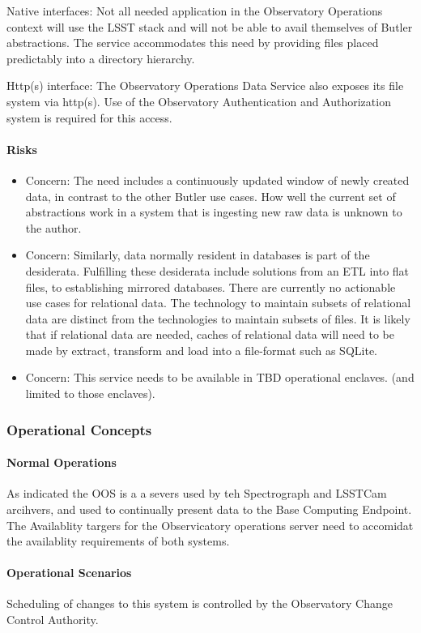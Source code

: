 Native interfaces: Not all needed application in the Observatory Operations context 
will use the LSST stack and will not be able to avail themselves of Butler abstractions.  
The service accommodates this need by providing files placed predictably into a 
directory hierarchy.

Http(s) interface: The Observatory Operations Data Service also exposes its 
file system via http(s). Use of the Observatory Authentication and Authorization 
system is required for this access.

\paragraph{Risks}

\begin{itemize}

\item Concern: The need includes a continuously updated window of newly created 
data, in contrast to the other Butler use cases.  How well the current set of 
abstractions work in a system that is ingesting new raw data  is unknown to the 
author.  

\item Concern: Similarly, data normally resident in databases is part of the desiderata. 
Fulfilling these desiderata include solutions from an ETL into flat files, to 
establishing mirrored databases. There are currently no actionable use cases 
for relational data. The technology to maintain subsets of relational data are distinct 
from the technologies to maintain subsets of files. It is likely that if relational data are 
needed, caches of relational data will need to be made by extract, transform and load 
into a file-format such as SQLite. 

\item Concern: This service needs to be available in TBD operational enclaves. (and limited to those enclaves).

\end{itemize}

\subsubsection{Operational Concepts}

\paragraph{Normal Operations}

As indicated the OOS is a a severs used by teh Spectrograph and LSSTCam arcihvers, and used
to continually present data to the Base Computing Endpoint. The Availablity targers for the
Observicatory operations server need to accomidat the availablity requirements of both systems.

\paragraph{Operational Scenarios}

Scheduling of changes to this system is controlled by the Observatory Change Control Authority.
